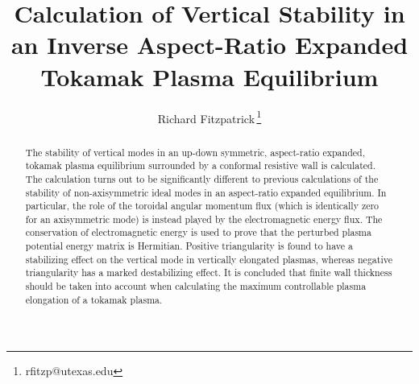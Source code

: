 \documentclass[12pt,prb,aps]{revtex4-1}
\begin{document}
\title{Calculation of Vertical Stability in an Inverse Aspect-Ratio Expanded Tokamak Plasma Equilibrium}
\author{Richard Fitzpatrick\,\footnote{rfitzp@utexas.edu}}

\begin{abstract}
The  stability of vertical modes in an up-down symmetric, aspect-ratio expanded, tokamak plasma equilibrium surrounded by
a conformal resistive wall is calculated. The calculation turns out to be significantly different to previous calculations of the stability
of non-axisymmetric ideal modes in an aspect-ratio expanded equilibrium.  In particular, the role of the toroidal angular momentum flux (which is
identically zero for an axisymmetric mode) is instead played by the electromagnetic energy flux. The conservation of electromagnetic energy is used to prove that the perturbed plasma potential energy matrix is Hermitian. 
Positive triangularity is
found to have a stabilizing effect on the vertical mode in vertically elongated plasmas, whereas negative triangularity has a marked destabilizing effect. It is concluded that finite wall thickness should be taken into account when
calculating the maximum controllable plasma elongation of a tokamak plasma. 
\end{abstract}

\maketitle
\end{document}
